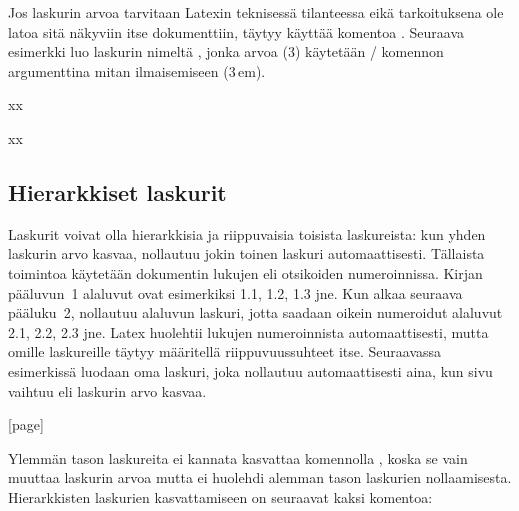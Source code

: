 Jos laskurin arvoa tarvitaan Latexin teknisessä tilanteessa eikä
tarkoituksena ole latoa sitä näkyviin itse dokumenttiin, täytyy käyttää
komentoa . Seuraava esimerkki luo laskurin nimeltä
, jonka arvoa (3) käytetään \-/ komennon
argumenttina mitan ilmaisemiseen (3\,em).

\begin{koodilohkosis}
\setcounter{mitta}{3}
xx
\end{koodilohkosis}

\begin{tulossis}
  x\hspace{3em}x
\end{tulossis}

\subsection{Hierarkkiset laskurit}
\label{luku/hierarkkiset-laskurit}

Laskurit voivat olla hierarkkisia ja riippuvaisia toisista laskureista:
kun yhden laskurin arvo kasvaa, nollautuu jokin toinen laskuri
automaattisesti. Tällaista toimintoa käytetään dokumentin lukujen eli
otsikoiden numeroinnissa. Kirjan pääluvun~1 alaluvut ovat esimerkiksi
1.1, 1.2, 1.3 jne. Kun alkaa seuraava pääluku~2, nollautuu alaluvun
laskuri, jotta saadaan oikein numeroidut alaluvut 2.1, 2.2, 2.3 jne.
Latex huolehtii lukujen numeroinnista automaattisesti, mutta omille
laskureille täytyy määritellä riippuvuussuhteet itse. Seuraavassa
esimerkissä luodaan oma laskuri, joka nollautuu automaattisesti aina,
kun sivu vaihtuu eli laskurin  arvo kasvaa.

\begin{koodilohkosis}
[page]
\end{koodilohkosis}

\noindent
Ylemmän tason laskureita ei kannata kasvattaa komennolla
, koska se vain muuttaa laskurin arvoa mutta ei
huolehdi alemman tason laskurien nollaamisesta. Hierarkkisten laskurien
kasvattamiseen on seuraavat kaksi komentoa:

\begin{koodilohkosis}
\end{koodilohkosis}

